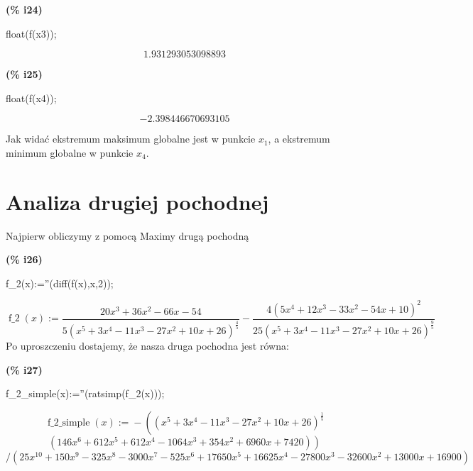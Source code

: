 \documentclass[a4paper]{article}
\begin{document}
\noindent
\begin{minipage}[t]{4.000000em}\color{red}\bfseries
(\% i24)	
\end{minipage}
\begin{minipage}[t]{\textwidth}\color{blue}
float(f(x3));
\end{minipage}
\[\displaystyle \tag{\% o24} 
1.931293053098893\mbox{}
\]


\noindent
\begin{minipage}[t]{4.000000em}\color{red}\bfseries
(\% i25)	
\end{minipage}
\begin{minipage}[t]{\textwidth}\color{blue}
float(f(x4));
\end{minipage}
\[\displaystyle \tag{\% o25} 
-2.398446670693105\mbox{}
\]

Jak widać ekstremum maksimum globalne jest w punkcie $x_1$, a ekstremum minimum globalne w punkcie $x_4$.
\section{Analiza drugiej pochodnej}
Najpierw obliczymy z pomocą Maximy drugą pochodną 


\noindent
\begin{minipage}[t]{4.000000em}\color{red}\bfseries
(\% i26)	
\end{minipage}
\begin{minipage}[t]{\textwidth}\color{blue}
f\_2(x):=''(diff(f(x),x,2));
\end{minipage}
\[\displaystyle \tag{\% o26} 
\operatorname{f\_ 2}(x)\operatorname{:=}\frac{20 {{x}^{3}}+36 {{x}^{2}}-66 x-54}{5 {{\left( {{x}^{5}}+3 {{x}^{4}}-11 {{x}^{3}}-27 {{x}^{2}}+10 x+26\right) }^{\frac{4}{5}}}}-
\frac{4 {{\left( 5 {{x}^{4}}+12 {{x}^{3}}-33 {{x}^{2}}-54 x+10\right) }^{2}}}{25 {{\left( {{x}^{5}}+3 {{x}^{4}}-11 {{x}^{3}}-27 {{x}^{2}}+10 x+26\right) }^{\frac{9}{5}}}}\mbox{}
\]
Po uproszczeniu dostajemy, że nasza druga pochodna jest równa:


\noindent
\begin{minipage}[t]{4.000000em}\color{red}\bfseries
(\% i27)	
\end{minipage}
\begin{minipage}[t]{\textwidth}\color{blue}
f\_2\_simple(x):=''(ratsimp(f\_2(x)));
\end{minipage}
\[
\operatorname{f\_ 2\_ simple}(x)\operatorname{:=}-\operatorname{(}{{\left( {{x}^{5}}+3 {{x}^{4}}-11 {{x}^{3}}-27 {{x}^{2}}+10 x+26\right) }^{\frac{1}{5}}}\]
\[\operatorname{(}146 {{x}^{6}}+612 {{x}^{5}}+
612 {{x}^{4}}-1064 {{x}^{3}}+354 {{x}^{2}}+6960 x+7420\operatorname{)}\operatorname{)}\]
\[/\operatorname{(}25 {{x}^{10}}+150 {{x}^{9}}-325 {{x}^{8}}-3000 {{x}^{7}}-525 {{x}^{6}}+17650 {{x}^{5}}+16625 {{x}^{4}}-27800 {{x}^{3}}-32600 {{x}^{2}}+13000 x+16900\operatorname{)}\mbox{}
\]
\end{document}
